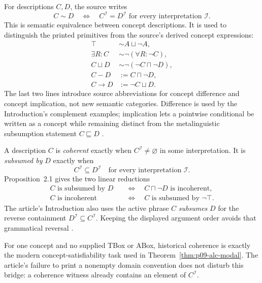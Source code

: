 For descriptions \(C,D\), the source writes
\[
 C\sim D
 \quad\Longleftrightarrow\quad
 C^{\mathcal I}=D^{\mathcal I}
 \text{ for every interpretation }\mathcal I.
\]
This is semantic equivalence between concept descriptions.  It is used to
distinguish the printed primitives from the source's derived concept
expressions:
\[
\begin{aligned}
 \top&\sim A\sqcup\neg A,\\
 \exists R:C&\sim\neg(\forall R:\neg C),\\
 C\sqcup D&\sim\neg(\neg C\sqcap\neg D),\\
 C-D&:=C\sqcap\neg D,\\
 C\mathbin{\to}D&:=\neg C\sqcup D.
\end{aligned}
\]
The last two lines introduce source abbreviations for concept difference and
concept implication, not new semantic categories.  Difference is used by the
Introduction's complement examples; implication lets a pointwise conditional
be written as a concept while remaining distinct from the metalinguistic
subsumption statement \(C\sqsubseteq D\)
\cite[pp.~2--6]{SchmidtSchaussSmolka1991}.

A description \(C\) is \emph{coherent} exactly when
\(C^{\mathcal I}\ne\varnothing\) in some interpretation.  It is
\emph{subsumed by} \(D\) exactly when
\[
 C^{\mathcal I}\subseteq D^{\mathcal I}
 \quad\text{for every interpretation }\mathcal I.
\]
Proposition~2.1 gives the two linear reductions
\[
\begin{aligned}
 C\text{ is subsumed by }D
 &\quad\Longleftrightarrow\quad
 C\sqcap\neg D\text{ is incoherent},\\
 C\text{ is incoherent}
 &\quad\Longleftrightarrow\quad
 C\text{ is subsumed by }\neg\top.
\end{aligned}
\]
The article's Introduction also uses the active phrase \(C\) \emph{subsumes}
\(D\) for the reverse containment \(D^{\mathcal I}\subseteq C^{\mathcal I}\).
Keeping the displayed argument order avoids that grammatical reversal
\cite[pp.~3, 5]{SchmidtSchaussSmolka1991}.

For one concept and no supplied TBox or ABox, historical coherence is exactly
the modern concept-satisfiability task used in
Theorem~\ref{thm:p09-alc-modal}.  The article's failure to print a nonempty
domain convention does not disturb this bridge: a coherence witness already
contains an element of \(C^{\mathcal I}\).


